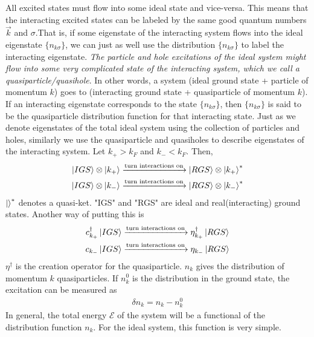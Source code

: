 \documentclass[twoside]{report}
\numberwithin{equation}{section}
\begin{document}
All excited states must flow into some ideal state and vice-versa.
This means that the interacting excited states can be labeled by the same good quantum numbers \(\vec k\) and \(\sigma\).That is, if some eigenstate of the interacting system flows into the ideal eigenstate \(\{n_{k\sigma}\}\), we can just as well use the distribution \(\{n_{k\sigma}\}\) to label the interacting eigenstate.
\textit{The particle and hole excitations of the ideal system might flow into some very complicated state of the interacting system, which we call a quasiparticle/quasihole}.
In other words, a system (ideal ground state + particle of momentum \(k\)) goes to (interacting ground state + quasiparticle of momentum \(k\)).
If an interacting eigenstate corresponds to the state \(\{n_{k\sigma}\}\), then \(\{n_{k\sigma}\}\) is said to be the quasiparticle distribution function for that interacting state.
Just as we denote eigenstates of the total ideal system using the collection of particles and holes, similarly we use the quasiparticle and quasiholes to describe eigenstates of the interacting system.
Let \(k_+>k_F\) and \(k_- < k_F\).
Then,
\begin{gather}
    \ket{IGS}\otimes\ket{k_+} \xrightarrow{\text{turn interactions on}} \ket{RGS}\otimes\ket{k_+}^* \\
    \ket{IGS}\otimes\ket{k_-} \xrightarrow{\text{turn interactions on}} \ket{RGS}\otimes\ket{k_-}^* \\
\end{gather}
\(\ket{}^*\) denotes a quasi-ket.
"IGS" and "RGS" are ideal and real(interacting) ground states.
Another way of putting this is
\begin{gather}
c^\dagger_{k_+}\ket{IGS} \xrightarrow{\text{turn interactions on}} \eta^\dagger_{k_+}\ket{RGS}\\
c_{k_-}\ket{IGS} \xrightarrow{\text{turn interactions on}} \eta_{k_-}\ket{RGS}
\end{gather}
\(\eta^\dagger\) is the creation operator for the quasiparticle.
\(n_k\) gives the distribution of momentum \(k\) quasiparticles.
If \(n^0_k\) is the distribution in the ground state, the excitation can be measured as 
\begin{equation}\begin{aligned}
\delta n_k = n_k - n^0_k
\end{aligned}\end{equation}
In general, the total energy \(\mathcal{E}\) of the system will be a functional of the distribution function \(n_k\).
For the ideal system, this function is very simple.
\end{document}
